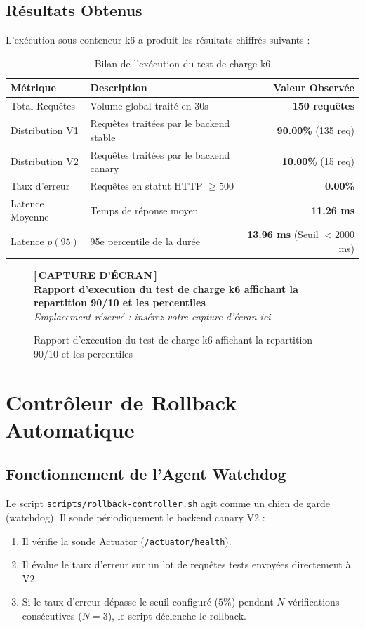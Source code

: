 \documentclass[12pt,a4paper]{article}
\newcommand{\screenshotplaceholder}[2][7cm]{%
  \begin{figure}[H]
    \centering
    \begin{tcolorbox}[
      width=0.95\textwidth,
      height=#1,
      valign=center,
      halign=center,
      colback=lightgray,
      colframe=secondaryblue!70,
      boxrule=1.5pt,
      dashed
    ]
      \centering
      \vspace{0.2cm}
      {\color{secondaryblue}\Huge\textbf{[\,CAPTURE D'ÉCRAN\,]}}\\[0.4cm]
      {\color{darkgray}\large\textbf{#2}}\\[0.2cm]
      {\small\textit{Emplacement réservé : insérez votre capture d'écran ici}}
      \vspace{0.2cm}
    \end{tcolorbox}
    \caption{#2}
    \label{fig:#2}
  \end{figure}
}
\begin{document}
\subsection{Résultats Obtenus}
L'exécution sous conteneur k6 a produit les résultats chiffrés suivants :
\begin{table}[H]
\centering
\caption{Bilan de l'exécution du test de charge k6}
\begin{tabularx}{0.85\textwidth}{l X r}
\toprule
\textbf{Métrique} & \textbf{Description} & \textbf{Valeur Observée} \\
\midrule
Total Requêtes & Volume global traité en 30s & \textbf{150 requêtes} \\
Distribution V1 & Requêtes traitées par le backend stable & \textbf{90.00\%} (135 req) \\
Distribution V2 & Requêtes traitées par le backend canary & \textbf{10.00\%} (15 req) \\
Taux d'erreur & Requêtes en statut HTTP $\ge 500$ & \textbf{0.00\%} \\
Latence Moyenne & Temps de réponse moyen & \textbf{11.26 ms} \\
Latence $p(95)$ & 95e percentile de la durée & \textbf{13.96 ms} (Seuil $< 2000$ ms) \\
\bottomrule
\end{tabularx}
\end{table}

\screenshotplaceholder[7cm]{Rapport d'execution du test de charge k6 affichant la repartition 90/10 et les percentiles}

\section{Contrôleur de Rollback Automatique}

\subsection{Fonctionnement de l'Agent Watchdog}
Le script \texttt{scripts/rollback-controller.sh} agit comme un chien de garde (watchdog). Il sonde périodiquement le backend canary V2 :
\begin{enumerate}
    \item Il vérifie la sonde Actuator (\texttt{/actuator/health}).
    \item Il évalue le taux d'erreur sur un lot de requêtes tests envoyées directement à V2.
    \item Si le taux d'erreur dépasse le seuil configuré ($5\%$) pendant $N$ vérifications consécutives ($N=3$), le script déclenche le rollback.
\end{enumerate}
\end{document}
